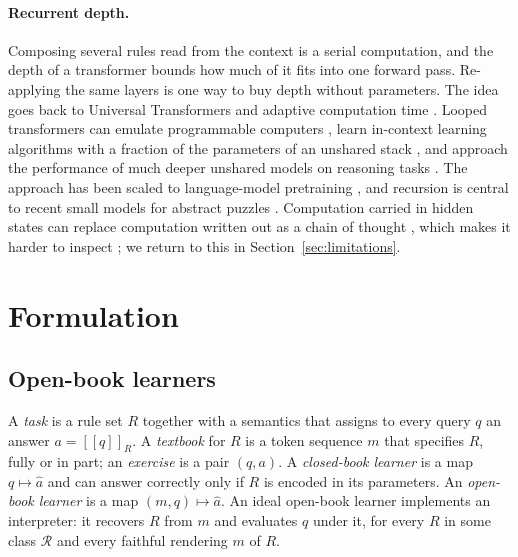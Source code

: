 \documentclass[11pt]{article}
\begin{document}
\paragraph{Recurrent depth.}
Composing several rules read from the context is a serial computation, and the depth of a transformer bounds how much of it fits into one forward pass.
Re-applying the same layers is one way to buy depth without parameters.
The idea goes back to Universal Transformers \citep{dehghani2019universal} and adaptive computation time \citep{graves2016act}.
Looped transformers can emulate programmable computers \citep{giannou2023looped}, learn in-context learning algorithms with a fraction of the parameters of an unshared stack \citep{yang2024looped}, and approach the performance of much deeper unshared models on reasoning tasks \citep{saunshi2025latent}.
The approach has been scaled to language-model pretraining \citep{geiping2025recurrent,zhu2025ouro,bae2025mor}, and recursion is central to recent small models for abstract puzzles \citep{wang2025hrm,jolicoeur2025trm}.
Computation carried in hidden states can replace computation written out as a chain of thought \citep{wei2022cot,nye2021scratchpad,hao2025coconut}, which makes it harder to inspect \citep{korbak2025monitorability}; we return to this in Section~\ref{sec:limitations}.

\section{Formulation}
\label{sec:formulation}

\subsection{Open-book learners}

A \emph{task} is a rule set $R$ together with a semantics that assigns to every query $q$ an answer $a = [\![q]\!]_R$.
A \emph{textbook} for $R$ is a token sequence $m$ that specifies $R$, fully or in part; an \emph{exercise} is a pair $(q, a)$.
A \emph{closed-book learner} is a map $q \mapsto \hat a$ and can answer correctly only if $R$ is encoded in its parameters.
An \emph{open-book learner} is a map $(m, q) \mapsto \hat a$.
An ideal open-book learner implements an interpreter: it recovers $R$ from $m$ and evaluates $q$ under it, for every $R$ in some class $\mathcal{R}$ and every faithful rendering $m$ of $R$.
\end{document}

